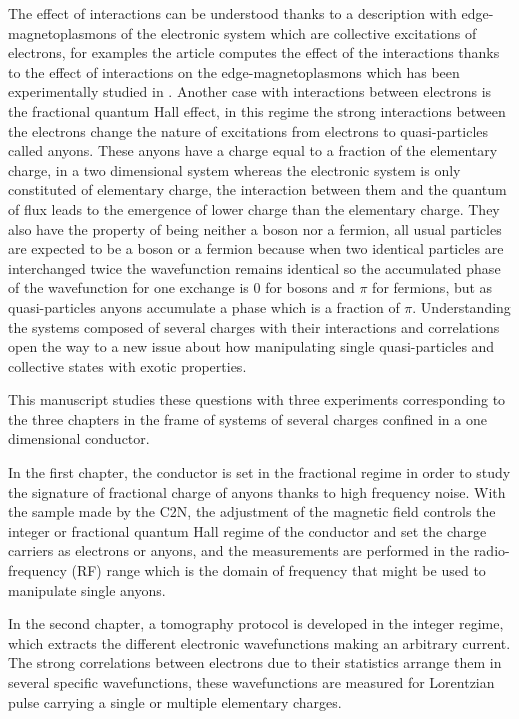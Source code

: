 The effect of interactions can be understood thanks to a description with edge-magnetoplasmons of the electronic system which are collective excitations of electrons, for examples the article \cite{ferraro2014real} computes the effect of the interactions thanks to the effect of interactions on the edge-magnetoplasmons which has been experimentally studied in \cite{bocquillon2013separation}.
Another case with interactions between electrons is the fractional quantum Hall effect, in this regime the strong interactions between the electrons change the nature of excitations from electrons to quasi-particles called anyons.  
These anyons have a charge equal to a fraction of the elementary charge, in a two dimensional system whereas the electronic system is only constituted of elementary charge, the interaction between them and the quantum of flux leads to the emergence of lower charge than the elementary charge.
They also have the property of being neither a boson nor a fermion, all usual particles are expected to be a boson or a fermion because when two identical particles are interchanged twice the wavefunction remains identical so the accumulated phase of the wavefunction for one exchange is 0 for bosons and $\pi$ for fermions, but as quasi-particles anyons accumulate a phase which is a fraction of $\pi$.
Understanding the systems composed of several charges with their interactions and correlations open the way to a new issue about how manipulating single quasi-particles and collective states with exotic properties.

\vspace{1 cm}

This manuscript studies these questions with three experiments corresponding to the three chapters in the frame of systems of several charges confined in a one dimensional conductor.

In the first chapter, the conductor is set in the fractional regime in order to study the signature of fractional charge of anyons thanks to high frequency noise.
With the sample made by the C2N, the adjustment of the magnetic field controls the integer or fractional quantum Hall regime of the conductor and set the charge carriers as electrons or anyons, and the measurements are performed in the radio-frequency (RF) range which is the domain of frequency that might be used to manipulate single anyons.
 
In the second chapter, a tomography protocol is developed in the integer regime, which extracts the different electronic wavefunctions making an arbitrary current. 
The strong correlations between electrons due to their statistics arrange them in several specific wavefunctions, these wavefunctions are measured for Lorentzian pulse carrying a single or multiple elementary charges. 


